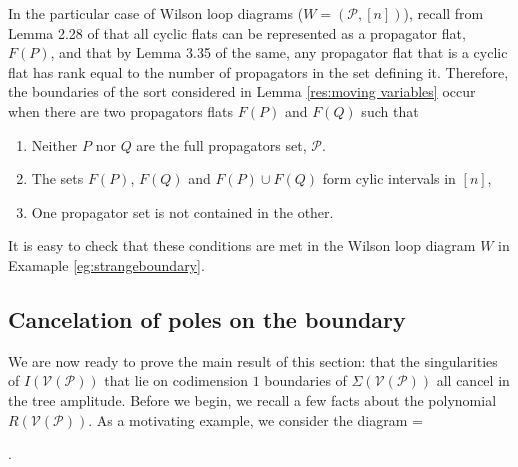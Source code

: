 \documentclass[11pt]{article}
\newcommand{\drawWLD}[2]{

\pgfmathsetmacro{\n}{#1}
\pgfmathsetmacro{\radius}{#2}
\pgfmathsetmacro{\angle}{360/\n}
\draw (0,0) circle (\radius);
    \foreach \i in {1,2,...,\n} {
      \draw (\angle*\i:\radius) node {$\bullet$};
    }

}
\newcommand{\drawprop}[4]{
\pgfmathsetmacro{\r}{#1}
\pgfmathsetmacro{\bumpr}{#2}
\pgfmathsetmacro{\s}{#3}
\pgfmathsetmacro{\bumps}{#4}
\pgfmathsetmacro{\perturbe}{\angle/\n}
\begin{scope}
\draw[smallpropagator] (\angle*\r + \angle/2 + \bumpr*\perturbe:\radius) -- (\angle*\s + \angle/2 + \bumps*\perturbe:\radius);
\end{scope}
}
\newcommand{\drawnumbers}{
  \foreach \i in {1,2,...,\n} {
  \pgfmathsetmacro{\x}{\angle*\i}
  \draw (\x:\radius*1.25) node {\footnotesize \i};
}
}
\def\ba #1\ea{\begin{align} #1 \end{align}}
\def\bas #1\eas{\begin{align*} #1 \end{align*}}
\newcommand{\cP}{\mathcal{P}}
\newcommand{\cV}{\mathcal{V}}
\newcommand{\VP}{\cV(\cP)}
\theoremstyle{remark}
\theoremstyle{definition}
\begin{document}
In the particular case of Wilson loop diagrams ($W = (\cP, [n])$), recall from Lemma 2.28 of \cite{wilsonloops} that all cyclic flats can be represented as a propagator flat, $F(P)$, and that by Lemma 3.35 of the same, any propagator flat that is a cyclic flat has rank equal to the number of propagators in the set defining it. Therefore, the boundaries of the sort considered in Lemma \ref{res:moving variables} occur when there are two propagators flats $F(P)$ and $F(Q)$ such that \begin{enumerate} \item Neither $P$ nor $Q$ are the full propagators set, $\cP$. \item The sets $F(P)$, $F(Q)$ and $F(P) \cup F(Q)$ form cylic intervals in $[n]$, \item One propagator set is not contained in the other. \end{enumerate} It is easy to check that these conditions are met in the Wilson loop diagram $W$ in Examaple \ref{eg:strangeboundary}.


\subsection{Cancelation of poles on the boundary}

We are now ready to prove the main result of this section: that the singularities of $I(\VP)$ that lie on codimension $1$ boundaries of $\Sigma(\VP)$ all cancel in the tree amplitude. Before we begin, we recall a few facts about the polynomial $R(\VP)$. As a motivating example, we consider the diagram \ba W =    \;.\label{eq:relevantexample}\ea %
\end{document}

